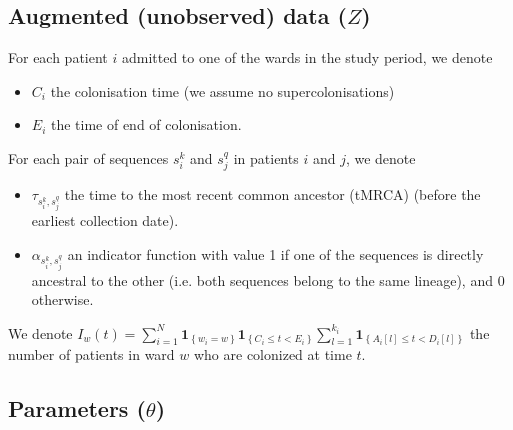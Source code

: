 \documentclass[10pt]{article}
\begin{document}
\subsection*{Augmented (unobserved) data ($Z$)}

For each patient $i$ admitted to one of the wards in the study period, we denote 
\begin{itemize}
	\item $C_i$ the colonisation time (we assume no supercolonisations)
	\item $E_i$ the time of end of colonisation.
\end{itemize}

For each pair of sequences $s_i^k$ and $s_j^q$ in patients $i$ and $j$, we denote
\begin{itemize}
	\item $\tau_{s_i^k,s_j^q}$ the time to the most recent common ancestor (tMRCA) (before the earliest collection date).
	\item $\alpha_{s_i^k,s_j^q}$ an indicator function with value 1 if one of the sequences is directly ancestral to the other (i.e. both sequences belong to the same lineage), and 0 otherwise.
\end{itemize}


\noindent We denote $I_w\left(t\right)=\sum_{i=1}^{N} \mathbf{1}_{\left\lbrace w_i=w \right\rbrace} \mathbf{1}_{\left\lbrace C_i \leq t < E_i \right\rbrace} \sum_{l=1}^{k_i} \mathbf{1}_{\left\lbrace A_i[l] \leq t < D_i[l] \right\rbrace} $  the number of patients in ward $w$ who are colonized at time $t$.

\subsection*{Parameters ($\theta$)}
\end{document}
